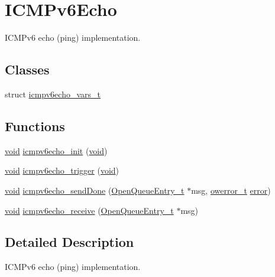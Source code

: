 \hypertarget{group___i_c_m_pv6_echo}{}\section{I\+C\+M\+Pv6\+Echo}
\label{group___i_c_m_pv6_echo}


I\+C\+M\+Pv6 echo (ping) implementation.  


\subsection*{Classes}
\begin{DoxyCompactItemize}
\item 
struct \hyperlink{structicmpv6echo__vars__t}{icmpv6echo\+\_\+vars\+\_\+t}
\end{DoxyCompactItemize}
\subsection*{Functions}
\begin{DoxyCompactItemize}
\item 
\hyperlink{usb__devapi_8h_afabf60e7f57651d6d595a02c75f07cd0}{void} \hyperlink{group___i_c_m_pv6_echo_gaa18a0f1c239132fc754e43f475b33995}{icmpv6echo\+\_\+init} (\hyperlink{usb__devapi_8h_afabf60e7f57651d6d595a02c75f07cd0}{void})
\item 
\hyperlink{usb__devapi_8h_afabf60e7f57651d6d595a02c75f07cd0}{void} \hyperlink{group___i_c_m_pv6_echo_ga9ac3ae0e9d1e46044070298bc24fee82}{icmpv6echo\+\_\+trigger} (\hyperlink{usb__devapi_8h_afabf60e7f57651d6d595a02c75f07cd0}{void})
\item 
\hyperlink{usb__devapi_8h_afabf60e7f57651d6d595a02c75f07cd0}{void} \hyperlink{group___i_c_m_pv6_echo_ga0502bcb8a36b276660fd1b4b40939753}{icmpv6echo\+\_\+send\+Done} (\hyperlink{struct_open_queue_entry__t}{Open\+Queue\+Entry\+\_\+t} $\ast$msg, \hyperlink{opendefs_8h_af20b7c3ed9d2ba19e56a309ad9314803}{owerror\+\_\+t} \hyperlink{disk_8c_ad018a3100b2dabad325a0800152db297}{error})
\item 
\hyperlink{usb__devapi_8h_afabf60e7f57651d6d595a02c75f07cd0}{void} \hyperlink{group___i_c_m_pv6_echo_gaa78a139f3dd544c9a78e5c7397419408}{icmpv6echo\+\_\+receive} (\hyperlink{struct_open_queue_entry__t}{Open\+Queue\+Entry\+\_\+t} $\ast$msg)
\end{DoxyCompactItemize}


\subsection{Detailed Description}
I\+C\+M\+Pv6 echo (ping) implementation. 

